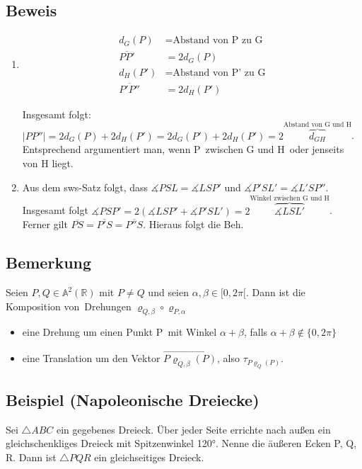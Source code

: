\subsection{Beweis}
\begin{enumerate}
	\item {}
	\begin{align*}
		d_G(P) &= \text{Abstand von P zu G} \\
		\overline{PP'} &= 2 d_G(P) \\
		d_H(P') &= \text{Abstand von P' zu G} \\
		\overline{P'P''} &= 2 d_H(P')
	\end{align*}

	Insgesamt folgt: $|PP''| = 2 d_G(P) + 2 d_H(P') = 2 d_G(P') + 2 d_H(P') = 2 \overbrace{d_{GH}}^{\text{Abstand von G und H}}$.
	Entsprechend argumentiert man, wenn P zwischen G und H oder jenseits von H liegt.

	\item {}
	Aus dem sws-Satz folgt, dass $\measuredangle PSL = \measuredangle LSP'$ und $\measuredangle P'SL' = \measuredangle L'SP''$.
	Insgesamt folgt $\measuredangle PSP' = 2 (\measuredangle LSP' + \measuredangle P'SL') = 2 \overbrace{\measuredangle LSL'}^{\text{Winkel zwischen G und H}}$.
	Ferner gilt $\overline{PS} = \overline{P'S} = \overline{P''S}$. Hieraus folgt die Beh. %
\end{enumerate}

\subsection{Bemerkung}
Seien $P, Q \in \mathbb{A}^2(\mathbb{R})$ mit $P \neq Q$ und seien $\alpha, \beta \in [0, 2 \pi[$.
Dann ist die Komposition von Drehungen $\varrho_{Q, \beta} \circ \varrho_{P, \alpha}$
\begin{itemize}
	\item eine Drehung um einen Punkt P mit Winkel $\alpha + \beta$, falls $\alpha + \beta \notin \{0, 2 \pi\}$
	\item eine Translation  um den Vektor $\overrightarrow{P \varrho_{Q, \beta}(P)}$, also $\tau_{P \varrho_{Q}(P)}$.
\end{itemize}

\subsection{Beispiel (Napoleonische Dreiecke)}
Sei $\triangle ABC$ ein gegebenes Dreieck. Über jeder Seite errichte nach außen ein gleichschenkliges Dreieck mit Spitzenwinkel 120°. 
Nenne die äußeren Ecken P, Q, R. Dann ist $\triangle PQR$ ein gleichseitiges Dreieck.


